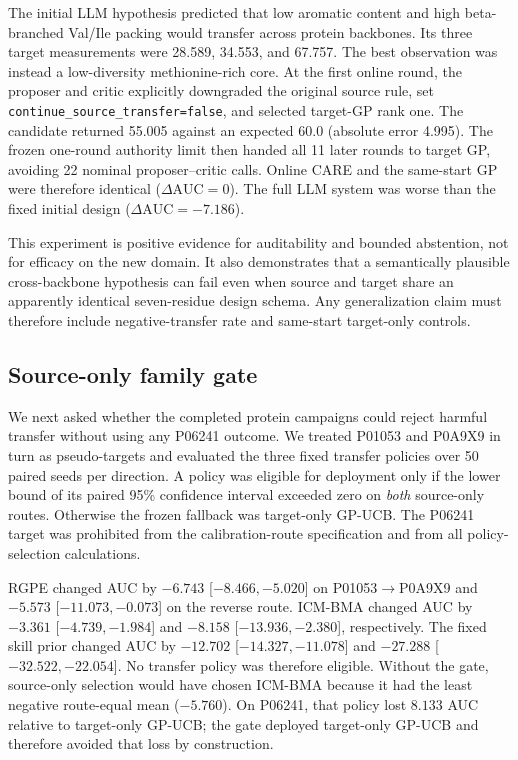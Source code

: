 \documentclass[pdflatex,sn-nature]{sn-jnl}
\newcommand{\dauc}{\Delta\mathrm{AUC}}
\newcommand{\code}[1]{\texttt{#1}}
\begin{document}
\begin{appendices}
The initial LLM hypothesis predicted that low aromatic content and high
beta-branched Val/Ile packing would transfer across protein backbones. Its three
target measurements were 28.589, 34.553, and 67.757. The best observation was
instead a low-diversity methionine-rich core. At the first online round, the
proposer and critic explicitly downgraded the original source rule, set
\code{continue\_source\_transfer=false}, and selected target-GP rank one. The
candidate returned 55.005 against an expected 60.0 (absolute error 4.995).
The frozen one-round authority limit then handed all 11 later rounds to target
GP, avoiding 22 nominal proposer--critic calls. Online CARE and the same-start
GP were therefore identical ($\dauc=0$). The full LLM system was worse than the
fixed initial design ($\dauc=-7.186$).

This experiment is positive evidence for auditability and bounded abstention,
not for efficacy on the new domain. It also demonstrates that a semantically
plausible cross-backbone hypothesis can fail even when source and target share
an apparently identical seven-residue design schema. Any generalization claim
must therefore include negative-transfer rate and same-start target-only
controls.

\subsection{Source-only family gate}
\label{sec:flip2_source_only_gate}

We next asked whether the completed protein campaigns could reject harmful
transfer without using any P06241 outcome. We treated P01053 and P0A9X9 in turn
as pseudo-targets and evaluated the three fixed transfer policies over 50 paired
seeds per direction. A policy was eligible for deployment only if the lower
bound of its paired 95\% confidence interval exceeded zero on \emph{both}
source-only routes. Otherwise the frozen fallback was target-only GP-UCB. The
P06241 target was prohibited from the calibration-route specification and from
all policy-selection calculations.

RGPE changed AUC by $-6.743$ [$-8.466,-5.020$] on P01053$\rightarrow$P0A9X9
and $-5.573$ [$-11.073,-0.073$] on the reverse route. ICM-BMA changed AUC by
$-3.361$ [$-4.739,-1.984$] and $-8.158$ [$-13.936,-2.380$], respectively.
The fixed skill prior changed AUC by $-12.702$ [$-14.327,-11.078$] and
$-27.288$ [$-32.522,-22.054$]. No transfer policy was therefore eligible.
Without the gate, source-only selection would have chosen ICM-BMA because it
had the least negative route-equal mean ($-5.760$). On P06241, that policy lost
$8.133$ AUC relative to target-only GP-UCB; the gate deployed target-only GP-UCB
and therefore avoided that loss by construction.


\end{appendices}
\end{document}
